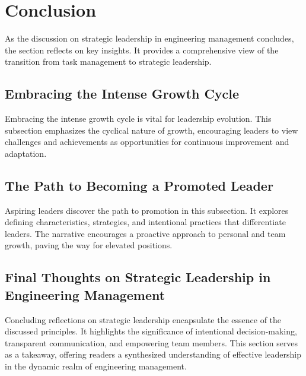 \documentclass[10pt]{article}
\begin{document}
\section{Conclusion}
As the discussion on strategic leadership in engineering management concludes, the section reflects on key insights. It provides a comprehensive view of the transition from task management to strategic leadership.

\subsection{Embracing the Intense Growth Cycle}
Embracing the intense growth cycle is vital for leadership evolution. This subsection emphasizes the cyclical nature of growth, encouraging leaders to view challenges and achievements as opportunities for continuous improvement and adaptation.

\subsection{The Path to Becoming a Promoted Leader}
Aspiring leaders discover the path to promotion in this subsection. It explores defining characteristics, strategies, and intentional practices that differentiate leaders. The narrative encourages a proactive approach to personal and team growth, paving the way for elevated positions.

\subsection{Final Thoughts on Strategic Leadership in Engineering Management}
Concluding reflections on strategic leadership encapsulate the essence of the discussed principles. It highlights the significance of intentional decision-making, transparent communication, and empowering team members. This section serves as a takeaway, offering readers a synthesized understanding of effective leadership in the dynamic realm of engineering management.

\newpage

\end{document}
